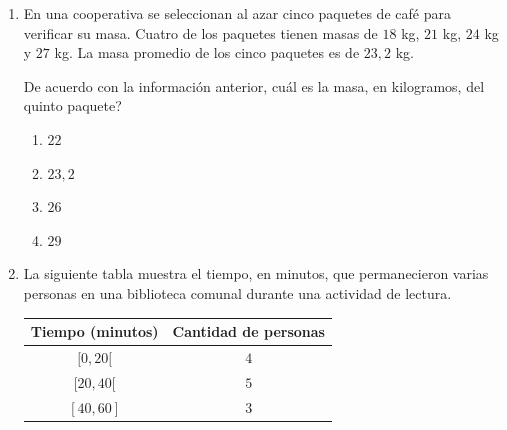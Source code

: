\documentclass[12pt]{article}
\newcommand{\opcion}[2]{\item $#2$}
\newcommand{\puntografico}{0.09}
\begin{document}
\begin{enumerate}[label=\textbf{\arabic*.}, start=29, itemsep=1cm]
\begin{center}
\end{center}

De acuerdo con la informaci\'on anterior, \textquestiondown cu\'al de los siguientes criterios podr\'ia modelar la altura de la pelota en funci\'on del tiempo?

\begin{enumerate}[label=\Alph*)]
  \opcion{A}{h(t)=-t^2+6t}
  \opcion{B}{h(t)=t^2+6t}
  \opcion{C}{h(t)=\sqrt{t}}
  \opcion{D}{h(t)=2^t}
\end{enumerate}

\Needspace{0.38\textheight}
\item
En una cooperativa se seleccionan al azar cinco paquetes de caf\'e para verificar su masa. Cuatro de los paquetes tienen masas de $18$ kg, $21$ kg, $24$ kg y $27$ kg. La masa promedio de los cinco paquetes es de $23{,}2$ kg.

De acuerdo con la informaci\'on anterior, \textquestiondown cu\'al es la masa, en kilogramos, del quinto paquete?

\begin{enumerate}[label=\Alph*)]
  \opcion{A}{22}
  \opcion{B}{23{,}2}
  \opcion{C}{26}
  \opcion{D}{29}
\end{enumerate}

\Needspace{0.58\textheight}
\item
La siguiente tabla muestra el tiempo, en minutos, que permanecieron varias personas en una biblioteca comunal durante una actividad de lectura.

\begin{center}
\renewcommand{\arraystretch}{1.35}
\begin{tabular}{|c|c|}
\hline
\textbf{Tiempo (minutos)} & \textbf{Cantidad de personas} \\ \hline
$[0,20[$  & $4$ \\ \hline
$[20,40[$ & $5$ \\ \hline
$[40,60]$ & $3$ \\ \hline
\end{tabular}
\end{center}


\end{enumerate}
\end{document}
